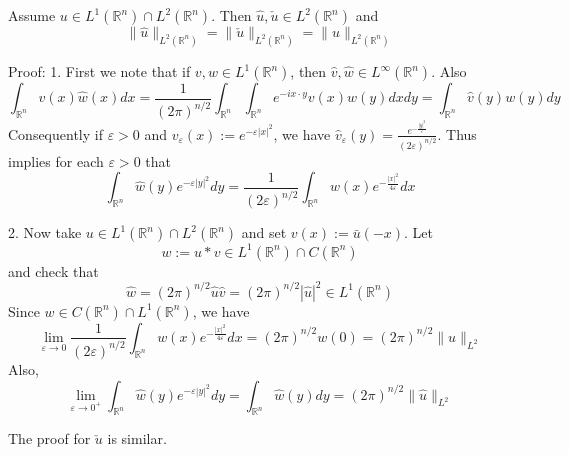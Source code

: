 \documentclass[12pt, a4paper, oneside]{book}
\begin{document}
\begin{theorem}
    Assume $u \in L^1\left(\mathbb{R}^n\right) \cap L^2\left(\mathbb{R}^n\right)$. Then $\hat{u}, \check{u} \in L^2\left(\mathbb{R}^n\right)$ and
    \begin{equation*}
        \|\hat{u}\|_{L^2\left(\mathbb{R}^n\right)}=\|\check{u}\|_{L^2\left(\mathbb{R}^n\right)}=\|u\|_{L^2\left(\mathbb{R}^n\right)}
    \end{equation*}

    Proof:
    1. First we note that if $v, w \in L^1\left(\mathbb{R}^n\right)$, then $\hat{v}, \hat{w} \in L^{\infty}\left(\mathbb{R}^n\right)$. Also
    \begin{equation*}
        \int_{\mathbb{R}^n} v(x) \hat{w}(x) d x
        =\frac{1}{(2 \pi)^{n / 2}} \int_{\mathbb{R}^n} \int_{\mathbb{R}^n} e^{-i x \cdot y} v(x) w(y) d x d y
        =\int_{\mathbb{R}^n} \hat{v}(y) w(y) dy
    \end{equation*}
    Consequently if $\varepsilon>0$ and $v_{\varepsilon}(x):=e^{-\varepsilon|x|^2}$, we have $\hat{v}_{\varepsilon}(y)=\frac{e^{-\frac{|y|^2}{\varepsilon}}}{(2 \varepsilon)^{n / 2}}$. Thus implies for each $\varepsilon>0$ that
    \begin{equation*}
        \int_{\mathbb{R}^n} \hat{w}(y) e^{-\varepsilon|y|^2} d y
        =
        \frac{1}{(2 \varepsilon)^{n / 2}} \int_{\mathbb{R}^n} w(x) e^{-\frac{|x|^2}{4 \varepsilon}} d x
    \end{equation*}

    2. Now take $u \in L^1\left(\mathbb{R}^n\right) \cap L^2\left(\mathbb{R}^n\right)$ and set $v(x):=\bar{u}(-x)$. Let
    \begin{equation*}
        w:=u * v \in L^1\left(\mathbb{R}^n\right) \cap C\left(\mathbb{R}^n\right)
    \end{equation*}
    and check that
    \begin{equation*}
        \hat{w}=(2 \pi)^{n / 2} \hat{u} \hat{v}
        =
        (2 \pi)^{n / 2} \left|\hat{u}\right|^2
        \in L^1 \left(\mathbb{R}^n\right)
    \end{equation*}
    Since $w \in C(\mathbb{R}^n)\cap L^1(\mathbb{R}^n)$, we have
    \begin{equation*}
        \lim _{\varepsilon \rightarrow 0} \frac{1}{(2 \varepsilon)^{n / 2}} \int_{\mathbb{R}^n} w(x) e^{-\frac{|x|^2}{4 \varepsilon}} d x=(2 \pi)^{n / 2} w(0)
        =
        (2 \pi)^{n / 2} \|u\|_{L^2}
    \end{equation*}
    Also,
    \begin{equation*}
        \lim_{\varepsilon\to 0^+}
        \int_{\mathbb{R}^n} \hat{w}(y) e^{-\varepsilon|y|^2} d y
        =
        \int_{\mathbb{R}^n} \hat{w}(y) dy
        =
        (2 \pi)^{n / 2} \|\hat{u}\|_{L^2}
    \end{equation*}

    The proof for $\check{u}$ is similar.
\end{theorem}
\end{document}
